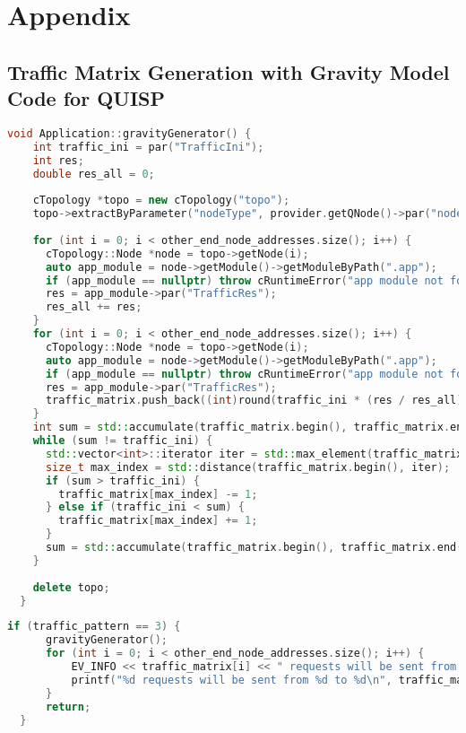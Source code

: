 \appendix
\chapter{Appendix}

\section{Traffic Matrix Generation with Gravity Model Code for QUISP}
\begin{lstlisting}[language=c++,caption=Gravity Generator Function, label=gravity_cpp]
  void Application::gravityGenerator() {
    int traffic_ini = par("TrafficIni");
    int res;
    double res_all = 0;
  
    cTopology *topo = new cTopology("topo");
    topo->extractByParameter("nodeType", provider.getQNode()->par("nodeType").str().c_str());
  
    for (int i = 0; i < other_end_node_addresses.size(); i++) {
      cTopology::Node *node = topo->getNode(i);
      auto app_module = node->getModule()->getModuleByPath(".app");
      if (app_module == nullptr) throw cRuntimeError("app module not found");
      res = app_module->par("TrafficRes");
      res_all += res;
    }
    for (int i = 0; i < other_end_node_addresses.size(); i++) {
      cTopology::Node *node = topo->getNode(i);
      auto app_module = node->getModule()->getModuleByPath(".app");
      if (app_module == nullptr) throw cRuntimeError("app module not found");
      res = app_module->par("TrafficRes");
      traffic_matrix.push_back((int)round(traffic_ini * (res / res_all)));
    }
    int sum = std::accumulate(traffic_matrix.begin(), traffic_matrix.end(), 0);
    while (sum != traffic_ini) {
      std::vector<int>::iterator iter = std::max_element(traffic_matrix.begin(), traffic_matrix.end());
      size_t max_index = std::distance(traffic_matrix.begin(), iter);
      if (sum > traffic_ini) {
        traffic_matrix[max_index] -= 1;
      } else if (traffic_ini < sum) {
        traffic_matrix[max_index] += 1;
      }
      sum = std::accumulate(traffic_matrix.begin(), traffic_matrix.end(), 0);
    }
  
    delete topo;
  }
  \end{lstlisting}
  
  \begin{lstlisting}[language=c++,caption=inside of initialize function]
  if (traffic_pattern == 3) {
      gravityGenerator();
      for (int i = 0; i < other_end_node_addresses.size(); i++) {
          EV_INFO << traffic_matrix[i] << " requests will be sent from " << my_address << " to " << other_end_node_addresses[i] << "\n";
          printf("%d requests will be sent from %d to %d\n", traffic_matrix[i], my_address, other_end_node_addresses[i]);
      }
      return;
  }
  \end{lstlisting}
  

